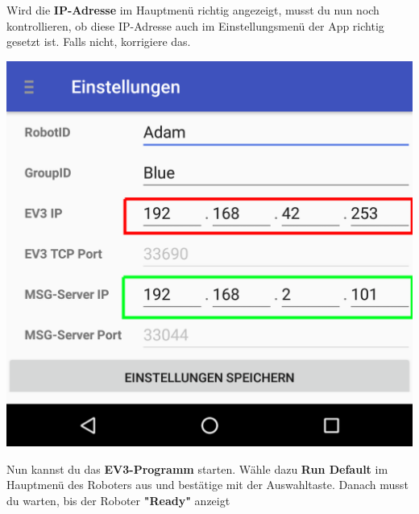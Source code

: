 \documentclass[
	12pt,
	article,
	type=bsc, %
	colorbacktitle,
	instlogo,
	accentcolor=tud1c,
	german,
	twoside
]{tudexercise}
\begin{document}
\begin{enumerate}
	
	\begin{minipage}{.45\textwidth}
	\item Wird die \textbf{IP-Adresse} im Hauptmenü richtig angezeigt, musst du nun noch kontrollieren, ob diese IP-Adresse auch im Einstellungsmenü der App richtig gesetzt ist. Falls nicht, korrigiere das.
	\end{minipage}
	\hspace{.05\textwidth}
	\begin{minipage}{.45\textwidth}
	\includegraphics[width=.8\textwidth]{img/app_settings_short.png}
	\end{minipage}
	\item Nun kannst du das \textbf{EV3-Programm }starten. Wähle dazu \textbf{Run Default} im Hauptmenü des Roboters aus und bestätige mit der Auswahltaste. Danach musst du warten, bis der Roboter \textbf{"Ready"} anzeigt
	

\end{enumerate}
\end{document}
